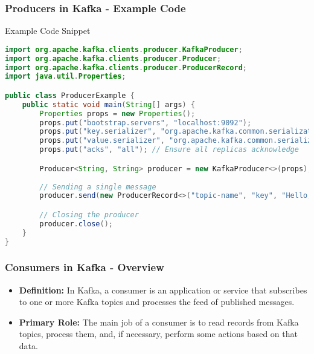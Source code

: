 \documentclass[aspectratio=169]{beamer}
\begin{document}
\begin{frame}[fragile]
    \frametitle{Producers in Kafka - Example Code}
    \begin{block}{Example Code Snippet}
        \begin{lstlisting}[language=java]
import org.apache.kafka.clients.producer.KafkaProducer;
import org.apache.kafka.clients.producer.Producer;
import org.apache.kafka.clients.producer.ProducerRecord;
import java.util.Properties;

public class ProducerExample {
    public static void main(String[] args) {
        Properties props = new Properties();
        props.put("bootstrap.servers", "localhost:9092");
        props.put("key.serializer", "org.apache.kafka.common.serialization.StringSerializer");
        props.put("value.serializer", "org.apache.kafka.common.serialization.StringSerializer");
        props.put("acks", "all"); // Ensure all replicas acknowledge

        Producer<String, String> producer = new KafkaProducer<>(props);
        
        // Sending a single message
        producer.send(new ProducerRecord<>("topic-name", "key", "Hello, Kafka!"));

        // Closing the producer
        producer.close();
    }
}
        \end{lstlisting}
    \end{block}
\end{frame}

\begin{frame}[fragile]
    \frametitle{Consumers in Kafka - Overview}
    \begin{itemize}
        \item \textbf{Definition:} 
        In Kafka, a consumer is an application or service that subscribes to one or more Kafka topics and processes the feed of published messages.
        
        \item \textbf{Primary Role:}
        The main job of a consumer is to read records from Kafka topics, process them, and, if necessary, perform some actions based on that data.
    \end{itemize}
\end{frame}
\end{document}
